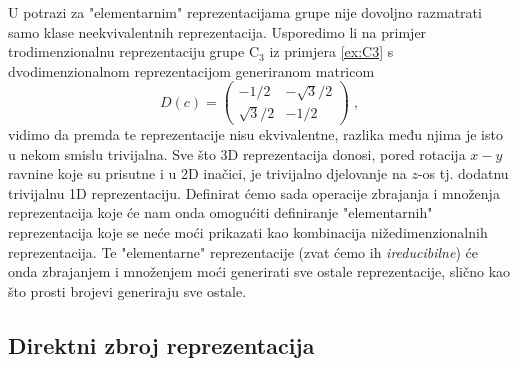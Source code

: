 U potrazi za "elementarnim" reprezentacijama grupe nije dovoljno razmatrati samo
klase neekvivalentnih reprezentacija. Usporedimo li na primjer
trodimenzionalnu reprezentaciju
grupe $\mathrm{C}_3$ iz primjera \ref{ex:C3} s dvodimenzionalnom reprezentacijom
generiranom matricom
\begin{equation}
  D(c) = 
\begin{pmatrix}
-1/2 & -\sqrt{3}/2  \\
\sqrt{3}/2 & -1/2 
\end{pmatrix} \;,
    \label{eq:c3rep2D}
\end{equation}
vidimo da premda te reprezentacije nisu ekvivalentne, razlika
među njima je isto u nekom smislu trivijalna.
Sve što 3D reprezentacija
donosi, pored rotacija $x-y$ ravnine koje su prisutne i u 2D inačici,
je trivijalno djelovanje na $z$-os tj. dodatnu trivijalnu 1D reprezentaciju.
Definirat ćemo sada operacije zbrajanja i množenja reprezentacija koje
će nam onda omogućiti definiranje "elementarnih" reprezentacija koje se
neće moći prikazati kao kombinacija nižedimenzionalnih reprezentacija.
Te "elementarne" reprezentacije (zvat ćemo ih \emph{ireducibilne}) će onda
zbrajanjem i množenjem moći generirati sve ostale reprezentacije,
slično kao što prosti brojevi generiraju sve ostale.

\subsection*{Direktni zbroj reprezentacija}

